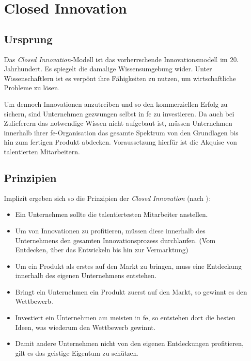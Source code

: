 \section{Closed Innovation}\label{sec:grundlagen-closed}

\subsection{Ursprung}
Das \textit{Closed Innovation}-Modell ist das vorherrschende Innovationsmodell im 20. Jahrhundert.
Es spiegelt die damalige Wissensumgebung wider.
Unter Wissenschaftlern ist es verpönt ihre Fähigkeiten zu nutzen, um wirtschaftliche Probleme zu lösen.

Um dennoch Innovationen anzutreiben und so den kommerziellen Erfolg zu sichern,
sind Unternehmen gezwungen selbst in \ac{fe} zu investieren.
Da auch bei Zulieferern das notwendige Wissen nicht aufgebaut ist,
müssen Unternehmen innerhalb ihrer \ac{fe}-Organisation das gesamte Spektrum von den Grundlagen bis hin zum fertigen Produkt abdecken.
Voraussetzung hierfür ist die Akquise von talentierten Mitarbeitern.

\subsection{Prinzipien}
Implizit ergeben sich so die Prinzipien der \textit{Closed Innovation} (nach \cite[19]{herzog2011}):
\begin{itemize}
    \item Ein Unternehmen sollte die talentiertesten Mitarbeiter anstellen.
    \item Um von Innovationen zu profitieren, müssen diese innerhalb des Unternehmens den gesamten Innovationsprozess durchlaufen. (Vom Entdecken, über das Entwickeln bis hin zur Vermarktung)
    \item Um ein Produkt als erstes auf den Markt zu bringen, muss eine Entdeckung innerhalb des eigenen Unternehmens entstehen.
    \item Bringt ein Unternehmen ein Produkt zuerst auf den Markt, so gewinnt es den Wettbewerb.
    \item Investiert ein Unternehmen am meisten in \ac{fe}, so entstehen dort die besten Ideen, was wiederum den Wettbewerb gewinnt.
    \item Damit andere Unternehmen nicht von den eigenen Entdeckungen profitieren, gilt es das geistige Eigentum zu schützen.
\end{itemize}

